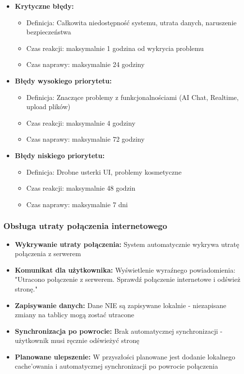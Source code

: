 \documentclass[12pt,a4paper]{article}
\begin{document}
\begin{itemize}[leftmargin=*]
    \item \textbf{Krytyczne błędy:} 
    \begin{itemize}
        \item Definicja: Całkowita niedostępność systemu, utrata danych, naruszenie bezpieczeństwa
        \item Czas reakcji: maksymalnie 1 godzina od wykrycia problemu
        \item Czas naprawy: maksymalnie 24 godziny
    \end{itemize}
    \item \textbf{Błędy wysokiego priorytetu:}
    \begin{itemize}
        \item Definicja: Znaczące problemy z funkcjonalnościami (AI Chat, Realtime, upload plików)
        \item Czas reakcji: maksymalnie 4 godziny
        \item Czas naprawy: maksymalnie 72 godziny
    \end{itemize}
    \item \textbf{Błędy niskiego priorytetu:}
    \begin{itemize}
        \item Definicja: Drobne usterki UI, problemy kosmetyczne
        \item Czas reakcji: maksymalnie 48 godzin
        \item Czas naprawy: maksymalnie 7 dni
    \end{itemize}
\end{itemize}

\subsubsection{Obsługa utraty połączenia internetowego}

\begin{itemize}[leftmargin=*]
    \item \textbf{Wykrywanie utraty połączenia:} System automatycznie wykrywa utratę połączenia z serwerem
    \item \textbf{Komunikat dla użytkownika:} Wyświetlenie wyraźnego powiadomienia: "Utracono połączenie z serwerem. Sprawdź połączenie internetowe i odśwież stronę."
    \item \textbf{Zapisywanie danych:} Dane NIE są zapisywane lokalnie - niezapisane zmiany na tablicy mogą zostać utracone
    \item \textbf{Synchronizacja po powrocie:} Brak automatycznej synchronizacji - użytkownik musi ręcznie odświeżyć stronę
    \item \textbf{Planowane ulepszenie:} W przyszłości planowane jest dodanie lokalnego cache'owania i automatycznej synchronizacji po powrocie połączenia
\end{itemize}
\end{document}
